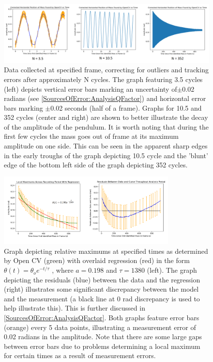 \documentclass[11pt]{article}
\begin{document}
        \begin{figure}[H]
            \centering\includegraphics[width = 1\textwidth]{correctedGraph.PNG}
            \caption{Data collected at specified frame, correcting for outliers and tracking errors after approximately N cycles. The graph featuring 3.5 cycles (left) depicts vertical error bars marking an uncertainty of$\pm$0.02 radians (see \ref{SourcesOfError:AnalysisQFactor}) and horizontal error bars marking $\pm$0.02 seconds (half of a frame). Graphs for 10.5 and 352 cycles (center and right) are shown to better illustrate the decay of the amplitude of the pendulum. It is worth noting that during the first few cycles the mass goes out of frame at its maximum amplitude on one side. This can be seen in the apparent sharp edges in the early troughs of the graph depicting 10.5 cycle and the 'blunt' edge of the bottom left side of the graph depicting 352 cycles.}
            \label{fig:correctedGraph}
        \end{figure}

        \begin{figure}[H]
            \centering\includegraphics[width = 0.8\textwidth]{tauGraph.PNG}
            \caption{Graph depicting relative maximums at specified times as determined by Open CV (green) with overlaid regression (red) in the form $\theta(t) = \theta_oe^{-t/\tau}$ \cite{labManual}, where $a = 0.198$ and $\tau = 1380$ (left). The graph depicting the residuals (blue) between the data and the regression (right) illustrates some significant discrepancy between the model and the measurement (a black line at 0 rad discrepancy is used to help illustrate this). This is further discussed in \ref{SourcesOfError:AnalysisQFactor}. Both graphs feature error bars (orange) every 5 data points, illustrating a measurement error of 0.02 radians in the amplitude. Note that there are some large gaps between error bars due to problems determining a local maximum for certain times as a result of measurement errors.}
            \label{fig:bestFit}
        \end{figure}
\end{document}
